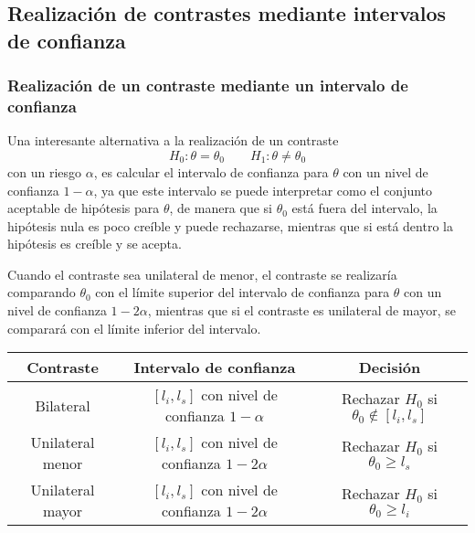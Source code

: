 \subsection{Realización de contrastes mediante intervalos de confianza}
\begin{frame}
\frametitle{Realización de un contraste mediante un intervalo de confianza}
Una interesante alternativa a la realización de un contraste
\[
H_0: \theta=\theta_0\qquad
H_1: \theta\neq \theta_0
\]
con un riesgo $\alpha$, es calcular el intervalo de confianza para $\theta$ con un nivel de confianza $1-\alpha$, ya
que este intervalo se puede interpretar como el conjunto aceptable de hipótesis para $\theta$, de manera que si
$\theta_0$ está fuera del intervalo, la hipótesis nula es poco creíble y puede rechazarse, mientras que si está dentro
la hipótesis es creíble y se acepta.

Cuando el contraste sea unilateral de menor, el contraste se realizaría comparando $\theta_0$ con el límite superior
del intervalo de confianza para $\theta$ con un nivel de confianza $1-2\alpha$, mientras que si el contraste es
unilateral de mayor, se comparará con el límite inferior del intervalo.
{\small
\begin{center} 
\begin{tabular}{|c|c|c|}
\hline
Contraste & Intervalo de confianza & Decisión\\
\hline
Bilateral & $[l_i,l_s]$ con nivel de confianza $1-\alpha$ & Rechazar $H_0$ si $\theta_0\not \in [l_i,l_s]$\\
Unilateral menor & $[l_i,l_s]$ con nivel de confianza $1-2\alpha$ & Rechazar $H_0$ si $\theta_0\geq l_s$\\
Unilateral mayor & $[l_i,l_s]$ con nivel de confianza $1-2\alpha$ & Rechazar $H_0$ si $\theta_0\geq l_i$\\
\hline
\end{tabular}
\end{center}
}
\end{frame}


